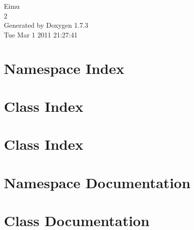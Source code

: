 \documentclass[a4paper]{book}
\begin{document}
\hypersetup{pageanchor=false}
\begin{titlepage}
\vspace*{7cm}
\begin{center}
{\Large Eimu \\[1ex]\large 2 }\\
\vspace*{1cm}
{\large Generated by Doxygen 1.7.3}\\
\vspace*{0.5cm}
{\small Tue Mar 1 2011 21:27:41}\\
\end{center}
\end{titlepage}
\clearemptydoublepage
{}
\tableofcontents
\clearemptydoublepage
{}
\hypersetup{pageanchor=true}
\chapter{Namespace Index}

\chapter{Class Index}

\chapter{Class Index}

\chapter{Namespace Documentation}








\chapter{Class Documentation}




















\printindex
\end{document}
